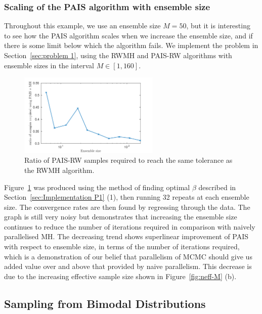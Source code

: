 \documentclass[final]{siamltex}
\begin{document}
\subsubsection{Scaling of the PAIS algorithm with ensemble size}

Throughout this example, we use an ensemble size $M=50$, but it is
interesting to see how the PAIS algorithm scales when we increase the
ensemble size, and if there is some limit below which the algorithm
fails. We implement the problem in Section~\ref{sec:problem 1}, using
the RWMH and PAIS-RW algorithms with ensemble sizes in the interval $M
\in [1, 160]$.

\begin{figure}[h]
\begin{center}
\includegraphics[width=0.6\textwidth]{"figures/PAIS_saving"}
\caption{Ratio of PAIS-RW samples required to reach the same tolerance as the RWMH algorithm.}
\label{fig:PAIS_saving}
\end{center}
\end{figure}

Figure~\ref{fig:PAIS_saving} was produced using the method of finding
optimal $\beta$ described in Section~\ref{sec:Implementation P1} (1),
then running 32 repeats at each ensemble size. The convergence rates
are then found by regressing through the data. The graph is still very
noisy but demonstrates that increasing the ensemble size continues to
reduce the number of iterations required in comparison with naively
parallelised MH. The decreasing trend shows superlinear improvement of
PAIS with respect to ensemble size, in terms of the number of
iterations required, which is a demonstration of our belief that
parallelism of MCMC should give us added value over and above that
provided by naive parallelism. This decrease is due to the increasing
effective sample size shown in Figure~\ref{fig:neff-M} (b).

\subsection{Sampling from Bimodal Distributions}\label{sec:bimodal}
\end{document}

